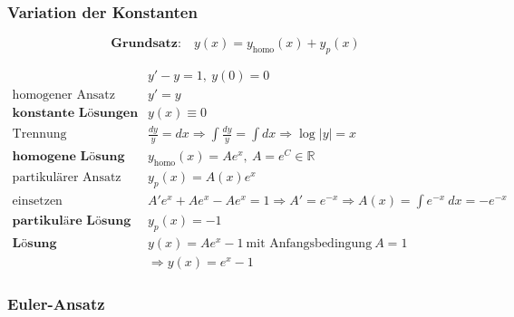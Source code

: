 \documentclass[11pt]{article}
\begin{document}
\subsubsection{Variation der Konstanten}

\begin{equation*}
	\textbf{Grundsatz:}\quad y(x) = y_\text{homo}(x) + y_p(x)
\end{equation*}

\begin{equation*}
\begin{split}
	& y' - y = 1,\ y(0) = 0 \\
	\text{homogener Ansatz}\quad & y' = y \\
	\textbf{konstante L{\"o}sungen}\quad & y(x) \equiv 0 \\
	\text{Trennung}\quad & \frac{dy}{y} = dx \Rightarrow \int\frac{dy}{y} = \int dx \Rightarrow \log|y| = x \\
	\textbf{homogene L{\"o}sung}\quad & y_\text{homo}(x) = Ae^x,\ A = e^C \in \mathbb{R} \\
	\text{partikul{\"a}rer Ansatz}\quad & y_p(x) = A(x)e^x \\
	\text{einsetzen}\quad & A'e^x + Ae^x - Ae^x = 1 \Rightarrow A' = e^{-x} \Rightarrow A(x) = \int e^{-x}\ dx = -e^{-x} \\
	\textbf{partikul{\"a}re L{\"o}sung}\quad & y_p(x) = -1 \\
	\textbf{L{\"o}sung}\quad & y(x) = Ae^x - 1\ \text{mit Anfangsbedingung}\ A = 1 \\
	& \Rightarrow y(x) = e^x - 1
\end{split}
\end{equation*}

%

\subsubsection{Euler-Ansatz}
\end{document}
